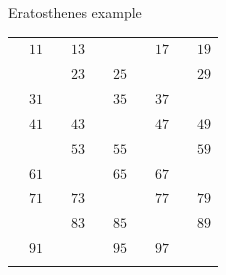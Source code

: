 \documentclass{beamer}
\begin{document}
\begin{frame}[plain]{Eratosthenes example}
{\begin{tabular}{r r r r r r r r r r}
			                   & \color{black} $11$ &                    & \color{black} $13$ &                    &                    &                    & \color{black} $17$ &                    & \color{black} $19$\\
			                   &                    &                    & \color{black} $23$ &                    & \color{  red} $25$ &                    &                    &                    & \color{black} $29$\\
			                   & \color{black} $31$ &                    &                    &                    & \color{  red} $35$ &                    & \color{black} $37$ &                    &                   \\
			                   & \color{black} $41$ &                    & \color{black} $43$ &                    &                    &                    & \color{black} $47$ &                    & \color{black} $49$\\
			                   &                    &                    & \color{black} $53$ &                    & \color{  red} $55$ &                    &                    &                    & \color{black} $59$\\
			                   & \color{black} $61$ &                    &                    &                    & \color{  red} $65$ &                    & \color{black} $67$ &                    &                   \\
			                   & \color{black} $71$ &                    & \color{black} $73$ &                    &                    &                    & \color{black} $77$ &                    & \color{black} $79$\\
			                   &                    &                    & \color{black} $83$ &                    & \color{  red} $85$ &                    &                    &                    & \color{black} $89$\\
			                   & \color{black} $91$ &                    &                    &                    & \color{  red} $95$ &                    & \color{black} $97$ &                    &                   \\
			\phantom{$888$} & \phantom{$888$} & \phantom{$888$} & \phantom{$888$} & \phantom{$888$} & \phantom{$888$} & \phantom{$888$} & \phantom{$888$} & \phantom{$888$} & \phantom{$888$}
        \end{tabular}
	}
	 {
		\begin{tabular}{r r r r r r r r r r}

\end{tabular}}
\end{frame}
\end{document}
